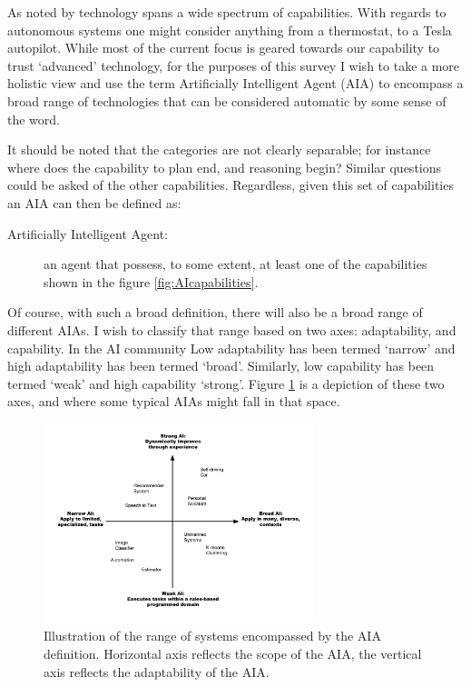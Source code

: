     As noted by \cite{Tripp2011-cq} technology spans a wide spectrum of capabilities. With regards to autonomous systems one might consider anything from a thermostat, to a Tesla autopilot. While most of the current focus is geared towards our capability to trust `advanced' technology, for the purposes of this survey I wish to take a more holistic view and use the term Artificially Intelligent Agent (AIA) to encompass a broad range of technologies that can be considered automatic by some sense of the word.

    It should be noted that the categories are not clearly separable; for instance where does the capability to plan end, and reasoning begin? Similar questions could be asked of the other capabilities. Regardless, given this set of capabilities an AIA can then be defined as:
    
    \begin{description}
        \item[Artificially Intelligent Agent:] an agent that possess, to some extent, at least one of the capabilities shown in the figure \ref{fig:AIcapabilities}. 
    \end{description}

    Of course, with such a broad definition, there will also be a broad range of different AIAs. I wish to classify that range based on two axes: adaptability, and capability. In the AI community Low adaptability has been termed `narrow' and high adaptability has been termed `broad'. Similarly, low capability has been termed `weak' and high capability `strong'. Figure \ref{fig:StrongWeak} is a depiction of these two axes, and where some typical AIAs might fall in that space.

	\begin{figure}[htbp]
    	\centering
     	\includegraphics[width=0.7\textwidth]{Figures/strong_weak_narrow_broad.pdf}
    	\caption{Illustration of the range of systems encompassed by the AIA definition. Horizontal axis reflects the scope of the AIA, the vertical axis reflects the adaptability of the AIA.}
        \label{fig:StrongWeak}
    \end{figure}

